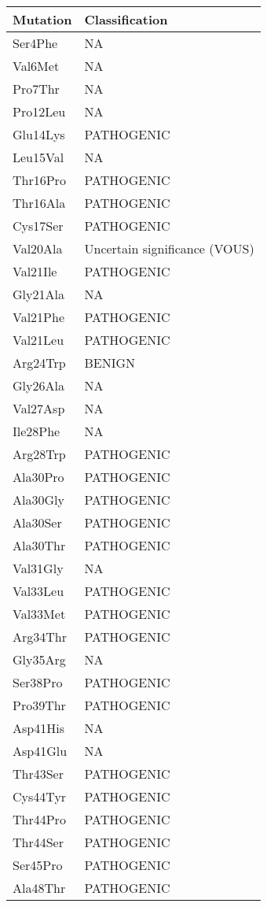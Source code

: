 \begin{tiny}
\begin{longtable}[l]{l|l}
	Mutation & Classification\\ \hline
	Ser4Phe & NA \\
	Val6Met & NA \\
	Pro7Thr & NA \\
	Pro12Leu & NA \\
	Glu14Lys & PATHOGENIC \\
	Leu15Val & NA \\
	Thr16Pro & PATHOGENIC \\
	Thr16Ala & PATHOGENIC \\
	Cys17Ser & PATHOGENIC \\
	Val20Ala & Uncertain significance (VOUS) \\
	Val21Ile & PATHOGENIC \\
	Gly21Ala & NA \\
	Val21Phe & PATHOGENIC \\
	Val21Leu & PATHOGENIC \\
	Arg24Trp & BENIGN \\
	Gly26Ala & NA \\
	Val27Asp & NA \\
	Ile28Phe & NA \\
	Arg28Trp & PATHOGENIC \\
	Ala30Pro & PATHOGENIC \\
	Ala30Gly & PATHOGENIC \\
	Ala30Ser & PATHOGENIC \\
	Ala30Thr & PATHOGENIC \\
	Val31Gly & NA \\
	Val33Leu & PATHOGENIC \\
	Val33Met & PATHOGENIC \\
	Arg34Thr & PATHOGENIC \\
	Gly35Arg & NA \\
	Ser38Pro & PATHOGENIC \\
	Pro39Thr & PATHOGENIC \\
	Asp41His & NA \\
	Asp41Glu & NA \\
	Thr43Ser & PATHOGENIC \\
	Cys44Tyr & PATHOGENIC \\
	Thr44Pro & PATHOGENIC \\
	Thr44Ser & PATHOGENIC \\
	Ser45Pro & PATHOGENIC \\
	Ala48Thr & PATHOGENIC \\

\end{longtable}
\end{tiny}

